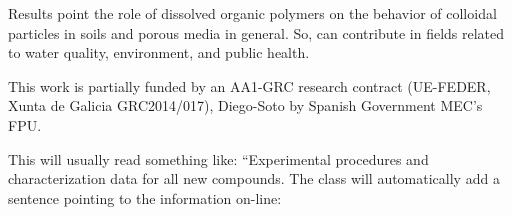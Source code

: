 \documentclass[journal=langd5,manuscript=article]{achemso}
\begin{document}
Results  point the role of dissolved organic polymers on the behavior of colloidal particles in soils and porous media in general. So, can contribute in fields related to 
water quality, environment, and public health.



\begin{acknowledgement}

This
work is partially funded by an AA1-GRC research contract (UE-FEDER,
Xunta de Galicia GRC2014/017), Diego-Soto by Spanish Government MEC’s FPU.

\end{acknowledgement}

\begin{suppinfo}

This will usually read something like: ``Experimental procedures and
characterization data for all new compounds. The class will
automatically add a sentence pointing to the information on-line:

\end{suppinfo}


\end{document}
